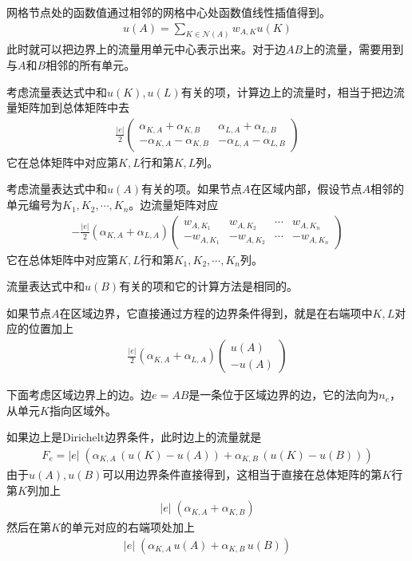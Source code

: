 \documentclass[12pt,a4paper]{article}
\begin{document}
网格节点处的函数值通过相邻的网格中心处函数值线性插值得到。
\begin{align*}
u(A) = \sum_{K \in \mathcal{N}(A)} w_{A,K} u(K)
\end{align*}
此时就可以把边界上的流量用单元中心表示出来。对于边$AB$上的流量，需要用到与$A$和$B$相邻的所有单元。

考虑流量表达式中和$u(K),u(L)$有关的项，计算边上的流量时，相当于把边流量矩阵加到总体矩阵中去
\begin{align*}
\frac{|e|}{2}
\left(
\begin{matrix}
\alpha_{K,A} + \alpha_{K,B} & \alpha_{L,A} + \alpha_{L,B} \\
-\alpha_{K,A} - \alpha_{K,B} & -\alpha_{L,A} - \alpha_{L,B}
\end{matrix}
\right)
\end{align*}
它在总体矩阵中对应第$K,L$行和第$K,L$列。

考虑流量表达式中和$u(A)$有关的项。如果节点$A$在区域内部，假设节点$A$相邻的单元编号为$K_1, K_2, \cdots, K_n$。边流量矩阵对应
\begin{align*}
-\frac{|e|}{2} (\alpha_{K,A} + \alpha_{L,A})
\left(
\begin{matrix}
w_{A,K_1} & w_{A,K_2} & \cdots & w_{A,K_n} \\
-w_{A,K_1} & -w_{A,K_2} & \cdots & -w_{A,K_n}
\end{matrix}
\right)
\end{align*}
它在总体矩阵中对应第$K,L$行和第$K_1, K_2, \cdots, K_n$列。

流量表达式中和$u(B)$有关的项和它的计算方法是相同的。

如果节点$A$在区域边界，它直接通过方程的边界条件得到，就是在右端项中$K,L$对应的位置加上
\begin{align*}
\frac{|e|}{2} (\alpha_{K,A} + \alpha_{L,A})
\left(
\begin{matrix}
u(A) \\
-u(A)
\end{matrix}
\right)
\end{align*}

下面考虑区域边界上的边。边$e = AB$是一条位于区域边界的边，它的法向为$n_e$，从单元$K$指向区域外。

如果边上是Dirichelt边界条件，此时边上的流量就是
\begin{align*}
F_{e} = |e| \; (\alpha_{K,A} \, (u(K) - u(A)) + \alpha_{K,B} \, (u(K) - u(B)))
\end{align*}
由于$u(A),u(B)$可以用边界条件直接得到，这相当于直接在总体矩阵的第$K$行第$K$列加上
\begin{align*}
|e| \; (\alpha_{K,A} + \alpha_{K,B})
\end{align*}
然后在第$K$的单元对应的右端项处加上
\begin{align*}
|e| \; (\alpha_{K,A} \, u(A) + \alpha_{K,B} \,  u(B))
\end{align*}
\end{document}

